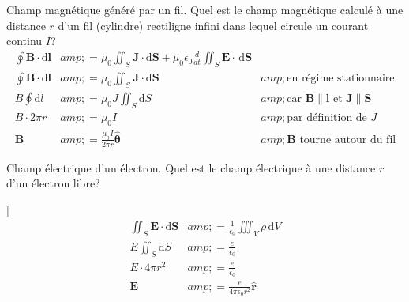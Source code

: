 Champ magnétique généré par un fil. 
Quel est le champ magnétique calculé à une distance $r$ d’un fil (cylindre) rectiligne infini dans lequel circule un courant continu $I$?
\[\begin{align*} \oint \boldsymbol{B} \cdot \mathrm{d}\boldsymbol{l} &amp;= \mu_0 \iint_S \boldsymbol{J}\cdot \mathrm{d}\boldsymbol{S} + \mu_0 \epsilon_0 \frac{d}{dt} \iint_S \boldsymbol{E}\cdot \,\mathrm{d}\boldsymbol{S}\\ \oint \boldsymbol{B} \cdot \mathrm{d}\boldsymbol{l} &amp;= \mu_0 \iint_S \boldsymbol{J}\cdot \mathrm{d}\boldsymbol{S} &amp; \textrm{en régime stationnaire}\\ B \oint \mathrm{d}l &amp;= \mu_0 J \iint_S \mathrm{d}S &amp; \textrm{car } \boldsymbol{B} \parallel \boldsymbol{l} \textrm{ et } \boldsymbol{J} \parallel \boldsymbol{S} \\ B \cdot 2\pi r &amp;= \mu_0 I &amp; \textrm{par définition de } J \\ \boldsymbol{B} &amp;= \frac{\mu_0 I}{2\pi r} \boldsymbol{\hat{\theta}}&amp; \boldsymbol{B} \textrm{ tourne autour du fil} \end{align*}\]

Champ électrique d’un électron. Quel est le champ électrique à une distance $r$ d’un électron libre?

[\begin{align*} \iint_{S} \boldsymbol{E} \cdot\mathrm{d}\boldsymbol{S} &amp;= \frac{1}{\epsilon_0} \iiint_V \rho \,\mathrm{d}V\\ E \iint_{S}\mathrm{d}S &amp;= \frac{e}{\epsilon_0}\\ E \cdot 4\pi r^2 &amp;= \frac{e}{\epsilon_0}\\ \boldsymbol{E} &amp;= \frac{e}{4\pi \epsilon_0 r^2} \boldsymbol{\hat{r}}\\ \end{align*}\]

